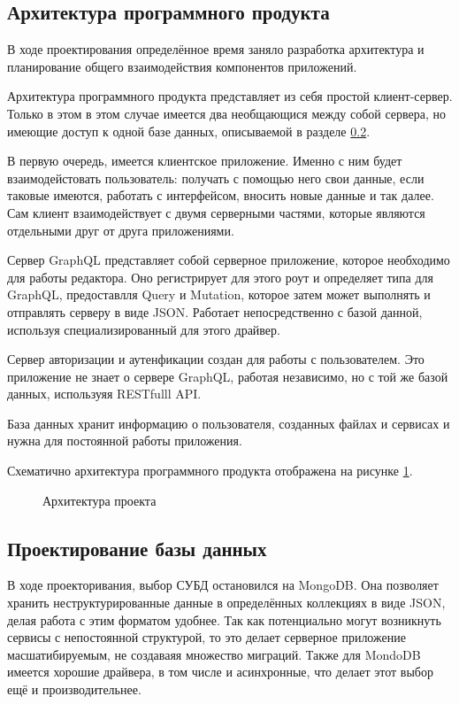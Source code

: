 \subsection{Архитектура программного продукта}

В ходе проектирования определённое время заняло разработка архитектура и планирование общего взаимодействия компонентов приложений.

Архитектура программного продукта представляет из себя простой клиент-сервер. Только в этом в этом случае имеется два необщающися между собой сервера, но имеющие
доступ к одной базе данных, описываемой в разделе \ref{des:bd_section}.

В первую очередь, имеется клиентское приложение. Именно с ним будет взаимодейстовать пользователь: получать с помощью него свои данные, если таковые имеются,
работать с интерфейсом, вносить новые данные и так далее. Сам клиент взаимодействует с двумя серверными частями, которые являются отдельными друг от друга приложениями.

Сервер GraphQL представляет собой серверное приложение, которое необходимо для работы редактора. Оно регистрирует для этого роут и определяет типа для GraphQL, предоставлля
Query и Mutation, которое затем может выполнять и отправлять серверу в виде JSON. Работает непосредственно с базой данной, используя специализированный для этого драйвер.

Сервер авторизации и аутенфикации создан для работы с пользователем. Это приложение не знает о сервере GraphQL, работая независимо, но с той же базой данных, используяя
RESTfulll API.

База данных хранит информацию о пользователя, созданных файлах и сервисах и нужна для постоянной работы приложения.

Схематично архитектура программного продукта отображена на рисунке \ref{des:arch}.

\begin{figure}[H]
    \caption{Архитектура проекта}
    \label{des:arch}
\end{figure}

\subsection{Проектирование базы данных}

\label{des:bd_section}

В ходе проекторивания, выбор СУБД остановился на MongoDB. Она позволяет хранить неструктурированные данные в определённых коллекциях в виде JSON, делая работа с этим форматом удобнее.
Так как потенциально могут возникнуть сервисы с непостоянной структурой, то это делает серверное приложение масшатибируемым, не создаваяя множество миграций. Также для MondoDB имеется
хорошие драйвера, в том числе и асинхронные, что делает этот выбор ещё и производительнее.

